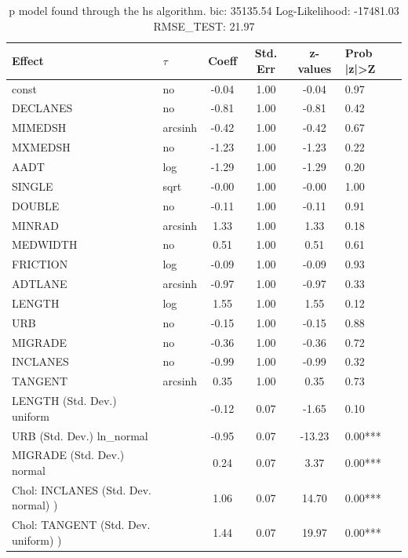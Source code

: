 \begin{table}
	\caption{p model found through the hs algorithm. bic: 35135.54 Log-Likelihood: -17481.03 RMSE_TEST: 21.97}
	\begin{center}
		\begin{tabular}{|l|l|c|c|c|l|}
			\hline
			Effect & $\tau$ & Coeff & Std. Err & z-values & Prob |z|>Z \\
			\hline
			const & no & -0.04 & 1.00 & -0.04 & 0.97 \\
			\hline
			DECLANES & no & -0.81 & 1.00 & -0.81 & 0.42 \\
			\hline
			MIMEDSH & arcsinh & -0.42 & 1.00 & -0.42 & 0.67 \\
			\hline
			MXMEDSH & no & -1.23 & 1.00 & -1.23 & 0.22 \\
			\hline
			AADT & log & -1.29 & 1.00 & -1.29 & 0.20 \\
			\hline
			SINGLE & sqrt & -0.00 & 1.00 & -0.00 & 1.00 \\
			\hline
			DOUBLE & no & -0.11 & 1.00 & -0.11 & 0.91 \\
			\hline
			MINRAD & arcsinh & 1.33 & 1.00 & 1.33 & 0.18 \\
			\hline
			MEDWIDTH & no & 0.51 & 1.00 & 0.51 & 0.61 \\
			\hline
			FRICTION & log & -0.09 & 1.00 & -0.09 & 0.93 \\
			\hline
			ADTLANE & arcsinh & -0.97 & 1.00 & -0.97 & 0.33 \\
			\hline
			LENGTH & log & 1.55 & 1.00 & 1.55 & 0.12 \\
			\hline
			URB & no & -0.15 & 1.00 & -0.15 & 0.88 \\
			\hline
			MIGRADE & no & -0.36 & 1.00 & -0.36 & 0.72 \\
			\hline
			INCLANES & no & -0.99 & 1.00 & -0.99 & 0.32 \\
			\hline
			TANGENT & arcsinh & 0.35 & 1.00 & 0.35 & 0.73 \\
			\hline
			LENGTH (Std. Dev.) uniform &  & -0.12 & 0.07 & -1.65 & 0.10 \\
			\hline
			URB (Std. Dev.) ln_normal &  & -0.95 & 0.07 & -13.23 & 0.00*** \\
			\hline
			MIGRADE (Std. Dev.) normal &  & 0.24 & 0.07 & 3.37 & 0.00*** \\
			\hline
			 Chol: INCLANES (Std. Dev. normal) ) &  & 1.06 & 0.07 & 14.70 & 0.00*** \\
			\hline
			 Chol: TANGENT (Std. Dev. uniform) ) &  & 1.44 & 0.07 & 19.97 & 0.00*** \\

\end{tabular}
\end{center}
\end{table}
